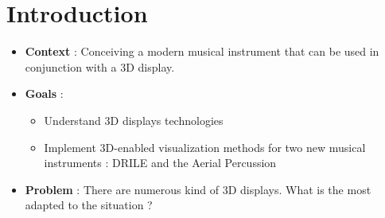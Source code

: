 \section{Introduction}
\begin{frame}
\begin{itemize}
\item \textbf{Context} : Conceiving a modern musical instrument that can be used in conjunction with a 3D display.

\item{\textbf{Goals} :
\begin{itemize}
\item Understand 3D displays technologies
\item Implement 3D-enabled visualization methods for two new musical instruments : DRILE and the Aerial Percussion
\end{itemize}
}

\item{\textbf{Problem} : There are numerous kind of 3D displays. What is the most adapted to the situation ?}
\end{itemize}
\end{frame}
